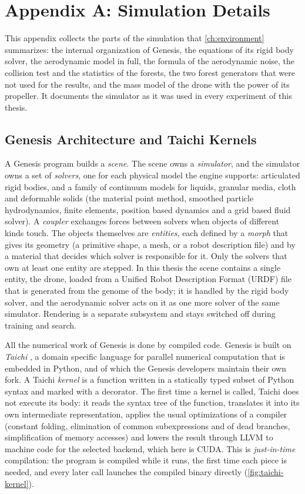 \chapter{Appendix A: Simulation Details}
\label{app:simulation}

This appendix collects the parts of the simulation that \autoref{ch:environment} summarizes: the internal organization of Genesis, the equations of its rigid body solver, the aerodynamic model in full, the formula of the aerodynamic noise, the collision test and the statistics of the forests, the two forest generators that were not used for the results, and the mass model of the drone with the power of its propeller. It documents the simulator as it was used in every experiment of this thesis.

\section{Genesis Architecture and Taichi Kernels}
\label{app:genesis-architecture}

A Genesis program builds a \emph{scene}. The scene owns a \emph{simulator}, and the simulator owns a set of \emph{solvers}, one for each physical model the engine supports: articulated rigid bodies, and a family of continuum models for liquids, granular media, cloth and deformable solids (the material point method, smoothed particle hydrodynamics, finite elements, position based dynamics and a grid based fluid solver). A \emph{coupler} exchanges forces between solvers when objects of different kinds touch. The objects themselves are \emph{entities}, each defined by a \emph{morph} that gives its geometry (a primitive shape, a mesh, or a robot description file) and by a material that decides which solver is responsible for it. Only the solvers that own at least one entity are stepped. In this thesis the scene contains a single entity, the drone, loaded from a Unified Robot Description Format (URDF) file that is generated from the genome of the body; it is handled by the rigid body solver, and the aerodynamic solver acts on it as one more solver of the same simulator. Rendering is a separate subsystem and stays switched off during training and search.

All the numerical work of Genesis is done by compiled code. Genesis is built on \emph{Taichi} \cite{hu2019taichi, hu2020difftaichi}, a domain specific language for parallel numerical computation that is embedded in Python, and of which the Genesis developers maintain their own fork. A Taichi \emph{kernel} is a function written in a statically typed subset of Python syntax and marked with a decorator. The first time a kernel is called, Taichi does not execute its body: it reads the syntax tree of the function, translates it into its own intermediate representation, applies the usual optimizations of a compiler (constant folding, elimination of common subexpressions and of dead branches, simplification of memory accesses) and lowers the result through LLVM to machine code for the selected backend, which here is CUDA. This is \emph{just-in-time} compilation: the program is compiled while it runs, the first time each piece is needed, and every later call launches the compiled binary directly (\autoref{fig:taichi-kernel}).

